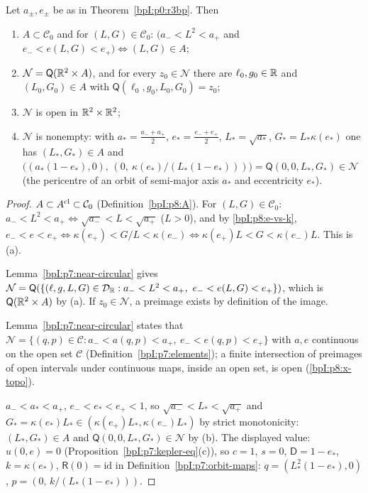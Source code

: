 \begin{proposition}\label{bpI:p8:topology}
Let $a_\pm,e_\pm$ be as in Theorem~\ref{bpI:p0:r3bp}. Then
\begin{enumerate}[label=(\alph*)]
\item $A\subset\mathcal C_0$ and for $(L,G)\in\mathcal C_0$: $\bigl(a_-<L^2<a_+$ and $e_-<e(L,G)<e_+\bigr)\iff(L,G)\in A$;
\item $\mathcal N=\mathsf Q(\mathbb{R}^2\times A)$, and for every $z_0\in\mathcal N$ there are $\ell_0,g_0\in\mathbb{R}$ and $(L_0,G_0)\in A$ with $\mathsf Q(\ell_0,g_0,L_0,G_0)=z_0$;
\item $\mathcal N$ is open in $\mathbb{R}^2\times\mathbb{R}^2$;
\item $\mathcal N$ is nonempty: with $a_*=\frac{a_-+a_+}2$, $e_*=\frac{e_-+e_+}2$, $L_*=\sqrt{a_*}$, $G_*=L_*\kappa(e_*)$ one has $(L_*,G_*)\in A$ and
  $\bigl((a_*(1-e_*),0),\,(0,\ \kappa(e_*)/(L_*(1-e_*)))\bigr)=\mathsf Q(0,0,L_*,G_*)\in\mathcal N$ (the pericentre of an orbit of semi-major axis $a_*$ and eccentricity $e_*$).
\end{enumerate}
\end{proposition}
\begin{proof}
\label{stepI:p8:tp-A} $A\subset A^{\rm cl}\subset\mathcal C_0$ (Definition~\ref{bpI:p8:A}). For $(L,G)\in\mathcal C_0$: $a_-<L^2<a_+\iff\sqrt{a_-}<L<\sqrt{a_+}$ ($L>0$), and by \eqref{bpI:p8:e-vs-k}, $e_-<e<e_+\iff\kappa(e_+)<G/L<\kappa(e_-)\iff\kappa(e_+)L<G<\kappa(e_-)L$. This is (a).

\label{stepI:p8:tp-chart} Lemma~\ref{bpI:p7:near-circular} gives $\mathcal N=\mathsf Q(\{(\ell,g,L,G)\in\mathcal D_\R:a_-<L^2<a_+,\ e_-<e(L,G)<e_+\})$, which is $\mathsf Q(\mathbb{R}^2\times A)$ by (a). If $z_0\in\mathcal N$, a preimage exists by definition of the image.

\label{stepI:p8:tp-open} Lemma~\ref{bpI:p7:near-circular} states that $\mathcal N=\{(q,p)\in\mathcal C:a_-<a(q,p)<a_+,\ e_-<e(q,p)<e_+\}$ with $a,e$ continuous on the open set $\mathcal C$ (Definition~\ref{bpI:p7:elements}); a finite intersection of preimages of open intervals under continuous maps, inside an open set, is open (\ref{bpI:p8:x-topo}).

\label{stepI:p8:tp-nonempty} $a_-<a_*<a_+$, $e_-<e_*<e_+<1$, so $\sqrt{a_-}<L_*<\sqrt{a_+}$ and $G_*=\kappa(e_*)L_*\in(\kappa(e_+)L_*,\kappa(e_-)L_*)$ by strict monotonicity: $(L_*,G_*)\in A$ and $\mathsf Q(0,0,L_*,G_*)\in\mathcal N$ by (b). The displayed value: $u(0,e)=0$ (Proposition~\ref{bpI:p7:kepler-eq}(c)), so $c=1$, $s=0$, $\mathsf D=1-e_*$, $k=\kappa(e_*)$, $\mathsf R(0)=\mathrm{id}$ in Definition~\ref{bpI:p7:orbit-maps}: $q=(L_*^2(1-e_*),0)$, $p=(0,\,k/(L_*(1-e_*)))$.
\end{proof}

